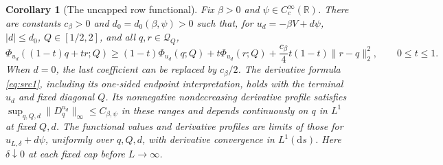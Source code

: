 \documentclass[11pt,a4paper]{article}
\numberwithin{equation}{section}
\newtheorem{corollary}[theorem]{Corollary}
\theoremstyle{definition}
\theoremstyle{remark}
\newcommand{\R}{\mathbb R}
\newcommand{\dd}{\mathrm d}
\begin{document}
\begin{corollary}[The uncapped row functional]
\label{cor:conc-hinge-stability}
Fix $\beta>0$ and $\psi\in C_c^\infty(\R)$.  There are constants
$c_\beta>0$ and $d_0=d_0(\beta,\psi)>0$ such that, for
$u_d=-\beta V+d\psi$, $|d|\le d_0$, $Q\in[1/2,2]$, and all
$q,r\in\mathcal Q_Q$,
\begin{equation}
 \Phi_{u_d}((1-t)q+tr;Q)
 \ge(1-t)\Phi_{u_d}(q;Q)+t\Phi_{u_d}(r;Q)
       +\frac{c_\beta}{4}t(1-t)\|r-q\|_2^2,
 \qquad 0\le t\le1.
 \label{eq:conc-chord}
\end{equation}
When $d=0$, the last coefficient can be replaced by $c_\beta/2$.
The derivative formula \eqref{eq:src1}, including its one-sided endpoint
interpretation, holds with the terminal $u_d$ and fixed diagonal $Q$.
Its nonnegative nondecreasing derivative profile satisfies
$\sup_{q,Q,d}\|D^{u_d}_q\|_\infty\le C_{\beta,\psi}$ in these ranges
and depends continuously on $q$ in $L^1$ at fixed $Q,d$.
The functional values and derivative profiles are limits of those for
$u_{L,\delta}+d\psi$, uniformly over $q,Q,d$, with derivative convergence
in $L^1(\dd s)$.  Here $\delta\downarrow0$ at each fixed cap before
$L\to\infty$.
\end{corollary}
\end{document}
